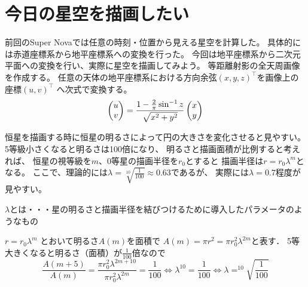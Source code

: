\documentclass[../../super_nova_2023]{subfiles}
\begin{document}
\chapter{今日の星空を描画したい}

前回のSuper Nova\cite{a}では任意の時刻・位置から見える星空を計算した。
具体的には赤道座標系から地平座標系への変換を行った。
今回は地平座標系から二次元平面への変換を行い、実際に星空を描画してみよう。
等距離射影の全天周画像を作成する。
任意の天体の地平座標系における方向余弦$(x,y,z)^\top$を画像上の座標$(u,v)^\top$
へ次式で変換する。
\vspace{-3mm}
\begin{align}
	\begin{pmatrix}
		u \\ v \\
	\end{pmatrix}
	=
	\frac{1-\frac{2}{\pi} \sin^{-1}{z}}{\sqrt{x^2 + y^2}}
	\begin{pmatrix}
		x \\ y \\
	\end{pmatrix}
	\notag
\end{align}

恒星を描画する時に恒星の明るさによって円の大きさを変化させると見やすい。
5等級小さくなると明るさは100倍になり、
明るさと描画面積が比例すると考えれば、
恒星の視等級を$m$、0等星の描画半径を$r_0$とすると
描画半径は$r = r_0 \lambda^m$となる。
ここで、理論的には$\lambda = \sqrt[10]{\frac{1}{100}} \approx 0.63$であるが、
実際には$\lambda = 0.7$程度が見やすい。
\begin{tcolorbox}
	\scriptsize
	$\lambda$とは・・・星の明るさと描画半径を結びつけるために導入したパラメータのようなもの\par
	$r = r_0 \lambda^m$ とおいて明るさ$A(m)$を面積で $ A(m) = \pi r^2 = \pi r_0^2 \lambda^{2m} $と表す． 
	5等大きくなると明るさ（面積）が$\frac{1}{100}$倍なので
	\[\frac{A(m+5)}{A(m)} = \frac{\pi r_0^2 \lambda^{2m+10}}{\pi r_0^2 \lambda^{2m}} = \frac{1}{100} \Leftrightarrow \lambda^{10} = \frac{1}{100} \Leftrightarrow \lambda = ^{10}\sqrt{\frac{1}{100}} \]
\end{tcolorbox}
\end{document}
